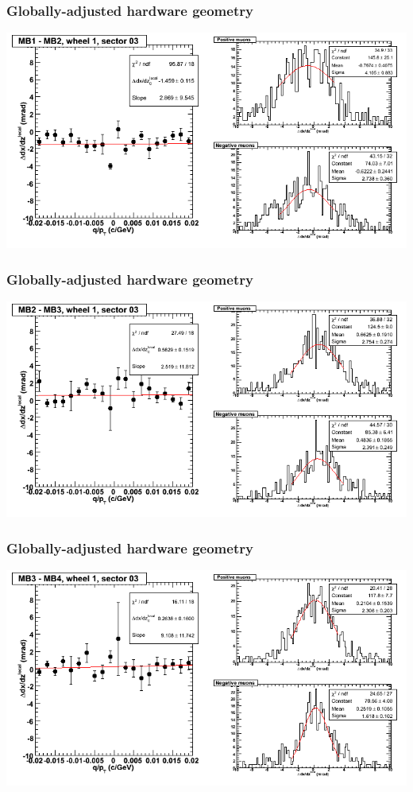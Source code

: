 \documentclass[compress]{beamer}
\begin{document}
\begin{frame}
\frametitle{Globally-adjusted hardware geometry}
\includegraphics[width=\linewidth]{NOV4_segdiffs_HW/dt13_slope_D_03_12.png}
\end{frame}

\begin{frame}
\frametitle{Globally-adjusted hardware geometry}
\includegraphics[width=\linewidth]{NOV4_segdiffs_HW/dt13_slope_D_03_23.png}
\end{frame}

\begin{frame}
\frametitle{Globally-adjusted hardware geometry}
\includegraphics[width=\linewidth]{NOV4_segdiffs_HW/dt13_slope_D_03_34.png}
\end{frame}
\end{document}
